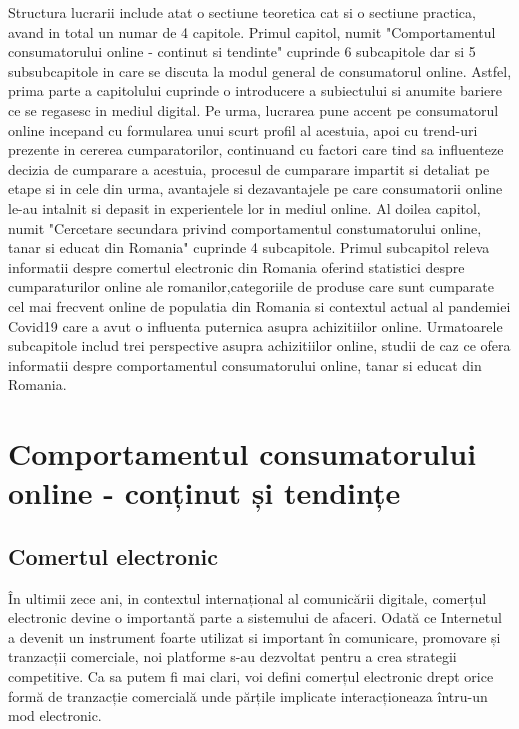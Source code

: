 \documentclass[a4paper, 12pt]{article}
\begin{document}
	\quad Structura lucrarii include atat o sectiune teoretica cat si o sectiune practica, avand in total un numar de 4 capitole. Primul capitol, numit "Comportamentul consumatorului online - continut si tendinte" cuprinde 6 subcapitole dar si 5 subsubcapitole in care se discuta la modul general de consumatorul online. Astfel, prima parte a capitolului cuprinde o introducere a subiectului si anumite bariere ce se regasesc in mediul digital. Pe urma, lucrarea pune accent pe consumatorul online incepand cu formularea unui scurt profil al acestuia, apoi cu trend-uri prezente in cererea cumparatorilor, continuand cu factori care tind sa influenteze decizia de cumparare a acestuia, procesul de cumparare impartit si detaliat pe etape si in cele din urma, avantajele si dezavantajele pe care consumatorii online le-au intalnit si depasit in experientele lor in mediul online. Al doilea capitol, numit "Cercetare secundara privind comportamentul constumatorului online, tanar si educat din Romania" cuprinde 4 subcapitole. Primul subcapitol releva informatii despre comertul electronic din Romania oferind statistici despre cumparaturilor online ale romanilor,categoriile de produse care sunt cumparate cel mai frecvent online de populatia din Romania si contextul actual al pandemiei Covid19 care a avut o influenta puternica asupra achizitiilor online. Urmatoarele subcapitole includ trei perspective asupra achizitiilor online, studii de caz ce ofera informatii despre comportamentul consumatorului online, tanar si educat din Romania.
		
\newpage
\setcounter{section}{0}
\section{ Comportamentul consumatorului online - conținut și tendințe}

\subsection{Comertul electronic}
\quad \quad\space În ultimii zece ani, in contextul internațional al comunicării digitale, comerțul electronic devine o importantă parte a sistemului de afaceri. Odată ce Internetul a devenit un instrument foarte utilizat si important în comunicare, promovare și tranzacții comerciale, noi platforme s-au dezvoltat pentru a crea strategii competitive. Ca sa putem fi mai clari, voi defini comerțul electronic drept orice formă de tranzacție comercială unde părțile implicate interacționeaza întru-un mod electronic.
\end{document}
